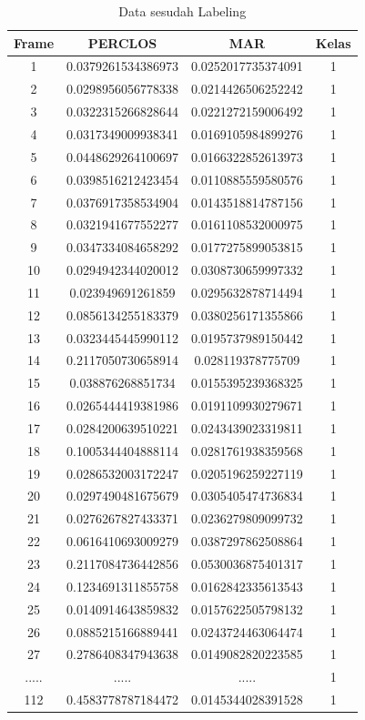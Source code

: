 \begin{longtable}{|c|c|c|c|}
  \caption{Data sesudah Labeling}
  \label{tb:DatasesudahLabel}                                   \\
  \hline
  \rowcolor[HTML]{C0C0C0}
  \textbf{Frame} & \textbf{PERCLOS} & \textbf{MAR} & \textbf{Kelas} \\
  \hline
  1 & 0.0379261534386973 & 0.0252017735374091 & 1 \\
  2 & 0.0298956056778338 & 0.0214426506252242 & 1 \\
  3 & 0.0322315266828644 & 0.0221272159006492 & 1\\
  4 & 0.0317349009938341 & 0.0169105984899276  & 1\\
  5 & 0.0448629264100697 & 0.0166322852613973 & 1 \\
  6 & 0.0398516212423454 & 0.0110885559580576 & 1 \\
  7 & 0.0376917358534904 & 0.0143518814787156 & 1 \\
  8 & 0.0321941677552277 & 0.0161108532000975 & 1 \\
  9 & 0.0347334084658292 & 0.0177275899053815 & 1 \\
  10 & 0.0294942344020012 & 0.0308730659997332 & 1 \\
  11 & 0.023949691261859  & 0.0295632878714494 & 1 \\
  12 & 0.0856134255183379 & 0.0380256171355866 & 1 \\
  13 & 0.0323445445990112 & 0.0195737989150442 & 1 \\
  14 & 0.2117050730658914 & 0.028119378775709 & 1  \\
  15 & 0.038876268851734  & 0.0155395239368325 & 1 \\
  16 & 0.0265444419381986 & 0.0191109930279671 & 1 \\
  17 & 0.0284200639510221 & 0.0243439023319811 & 1 \\
  18 & 0.1005344404888114 & 0.0281761938359568 & 1 \\
  19 & 0.0286532003172247 & 0.0205196259227119 & 1 \\
  20 & 0.0297490481675679 & 0.0305405474736834 & 1 \\
  21 & 0.0276267827433371 & 0.0236279809099732 & 1 \\
  22 & 0.0616410693009279 & 0.0387297862508864 & 1 \\
  23 & 0.2117084736442856 & 0.0530036875401317 & 1 \\
  24 & 0.1234691311855758 & 0.0162842335613543 & 1 \\
  25 & 0.0140914643859832 & 0.0157622505798132 & 1 \\
  26 & 0.0885215166889441 & 0.0243724463064474 & 1 \\
  27 & 0.2786408347943638 & 0.0149082820223585 & 1 \\
  ..... & ..... & ..... & 1\\
  112 & 0.4583778787184472 & 0.0145344028391528 & 1 \\
  \hline
\end{longtable}

